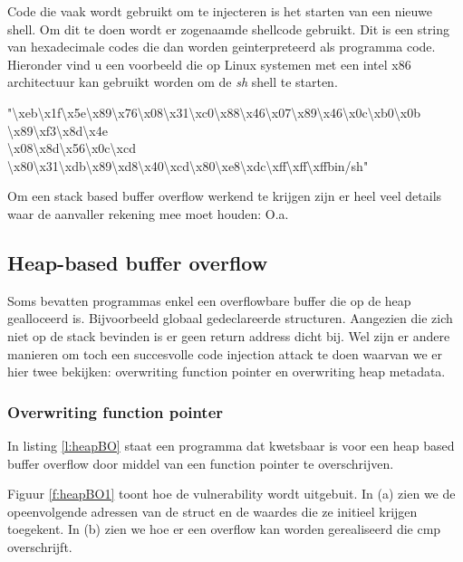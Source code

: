 \documentclass[../main.tex]{subfiles}
\begin{document}
Code die vaak wordt gebruikt om te injecteren is het starten van een nieuwe shell.
Om dit te doen wordt er zogenaamde shellcode gebruikt.
Dit is een string van hexadecimale codes die dan worden geinterpreteerd als programma code.
Hieronder vind u een voorbeeld die op Linux systemen met een intel x86 architectuur kan gebruikt worden om de \emph{sh} shell te starten.

\begin{blockquote}
	"\textbackslash xeb\textbackslash x1f\textbackslash x5e\textbackslash x89\textbackslash x76\textbackslash x08\textbackslash x31\textbackslash xc0\textbackslash x88\textbackslash x46\textbackslash x07\textbackslash x89\textbackslash x46\textbackslash x0c\textbackslash xb0\textbackslash x0b \textbackslash x89\textbackslash xf3\textbackslash x8d\textbackslash x4e \\\textbackslash x08\textbackslash x8d\textbackslash x56\textbackslash x0c\textbackslash xcd \textbackslash x80\textbackslash x31\textbackslash xdb\textbackslash x89\textbackslash xd8\textbackslash x40\textbackslash xcd\textbackslash x80\textbackslash xe8\textbackslash xdc\textbackslash xff\textbackslash xff\textbackslash xffbin/sh"
\end{blockquote}

Om een stack based buffer overflow werkend te krijgen zijn er heel veel details waar de aanvaller rekening mee moet houden: O.a. 

\subsection{Heap-based buffer overflow}
Soms bevatten programmas enkel een overflowbare buffer die op de heap gealloceerd is.
Bijvoorbeeld globaal gedeclareerde structuren.
Aangezien die zich niet op de stack bevinden is er geen return address dicht bij.
Wel zijn er andere manieren om toch een succesvolle code injection attack te doen waarvan we er hier twee bekijken: overwriting function pointer en overwriting heap metadata.
\subsubsection{Overwriting function pointer}
In listing \ref{l:heapBO} staat een programma dat kwetsbaar is voor een heap based buffer overflow door middel van een function pointer te overschrijven. 


Figuur \ref{f:heapBO1} toont hoe de vulnerability wordt uitgebuit.
In (a) zien we de opeenvolgende adressen van de struct en de waardes die ze initieel krijgen toegekent.
In (b) zien we hoe er een overflow kan worden gerealiseerd die cmp overschrijft.
\end{document}
